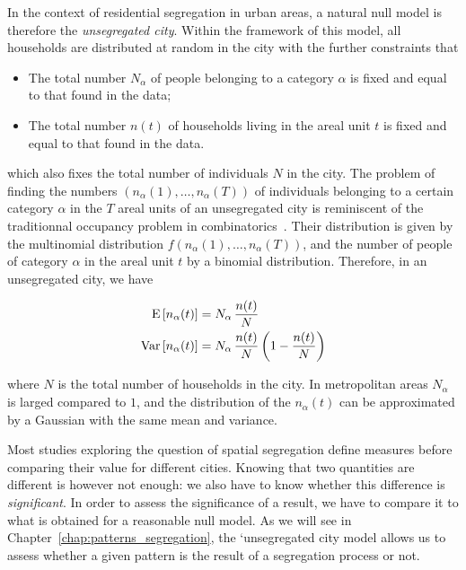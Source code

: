 In the context of residential segregation in urban areas, a natural null model
is therefore the \emph{unsegregated city}. Within the framework of this model,
all households are distributed at random in the city with the further
constraints that

\begin{itemize}
    \item The total number $N_\alpha$ of people belonging to a category
	    $\alpha$ is fixed and equal to that found in the data;
    \item The total number $n(t)$ of households living in the areal unit $t$ is
	    fixed and equal to that found in the data.
\end{itemize}

which also fixes the total number of individuals $N$ in the city. The problem of
finding the numbers $\left( n_\alpha(1), \dots, n_\alpha(T) \right)$ of
individuals belonging to a certain category $\alpha$ in the $T$ areal units of
an unsegregated city is reminiscent of the traditionnal occupancy problem in
combinatorics~\cite{Feller:1950}. Their distribution is given by the multinomial
distribution $f \left( n_\alpha(1), \dots, n_\alpha(T) \right)$, and the number
of people of category $\alpha$ in the areal unit $t$ by a binomial distribution.
Therefore, in an unsegregated city, we have

\begin{align}
    \begin{split}
	\mathrm{E} \left[ n_\alpha(t) \right] &= N_\alpha\,\frac{n(t)}{N} \\
	\mathrm{Var} \left[ n_\alpha(t) \right] &= N_\alpha\,\frac{n(t)}{N} \left( 1 - \frac{n(t)}{N}  \right) 
    \end{split}
\end{align}

where $N$ is the total number of households in the city. In metropolitan areas
$N_\alpha$ is larged compared to $1$, and the distribution of the $n_\alpha(t)$
can be approximated by a Gaussian with the same mean and variance.


Most studies exploring the question of spatial segregation define measures
before comparing their value for different cities. Knowing that two quantities
are different is however not enough: we also have to know whether this
difference is {\em significant}. In order to assess the significance of a
result, we have to compare it to what is obtained for a reasonable null model.
As we will see in Chapter~\ref{chap:patterns_segregation}, the 
`unsegregated city model allows us to assess whether a given pattern is
the result of a segregation process or not.\\

